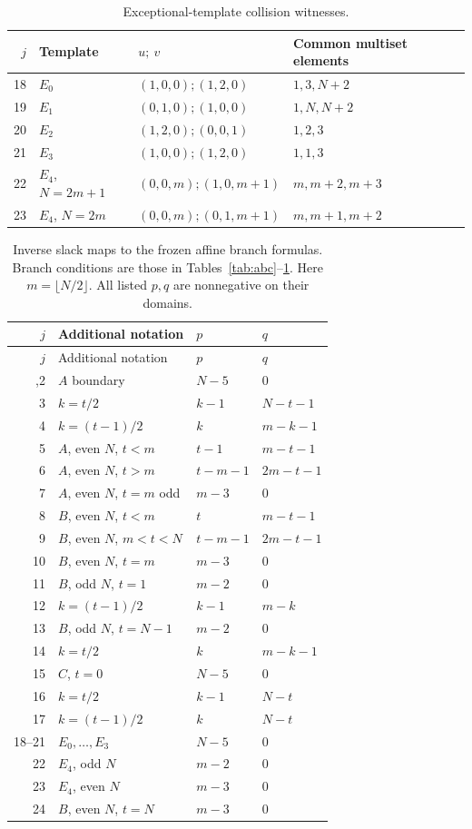 \documentclass[11pt,a4paper]{article}
\begin{document}
\begin{table}[ht]\centering\small
\caption{Exceptional-template collision witnesses.}\label{tab:exceptions}
\begin{tabular}{@{}rl ll@{}}\toprule
$j$ & Template & $u;\ v$ & Common multiset elements\\\midrule
18 & $E_0$ & $(1,0,0);(1,2,0)$ & $1,3,N+2$\\
19 & $E_1$ & $(0,1,0);(1,0,0)$ & $1,N,N+2$\\
20 & $E_2$ & $(1,2,0);(0,0,1)$ & $1,2,3$\\
21 & $E_3$ & $(1,0,0);(1,2,0)$ & $1,1,3$\\
22 & $E_4$, $N=2m+1$ & $(0,0,m);(1,0,m+1)$ & $m,m+2,m+3$\\
23 & $E_4$, $N=2m$ & $(0,0,m);(0,1,m+1)$ & $m,m+1,m+2$\\\bottomrule
\end{tabular}
\end{table}

\begingroup\small
\begin{longtable}{@{}r p{63mm} ll@{}}
\caption{Inverse slack maps to the frozen affine branch formulas. Branch conditions are those in Tables~\ref{tab:abc}--\ref{tab:exceptions}. Here $m=\lfloor N/2\rfloor$. All listed $p,q$ are nonnegative on their domains.}\label{tab:inverse}\\
\toprule $j$ & Additional notation & $p$ & $q$\\\midrule\endfirsthead
\toprule $j$ & Additional notation & $p$ & $q$\\\midrule\endhead
\bottomrule\endfoot
1,2 & $A$ boundary & $N-5$ & $0$\\
3 & $k=t/2$ & $k-1$ & $N-t-1$\\
4 & $k=(t-1)/2$ & $k$ & $m-k-1$\\
5 & $A$, even $N$, $t<m$ & $t-1$ & $m-t-1$\\
6 & $A$, even $N$, $t>m$ & $t-m-1$ & $2m-t-1$\\
7 & $A$, even $N$, $t=m$ odd & $m-3$ & $0$\\
8 & $B$, even $N$, $t<m$ & $t$ & $m-t-1$\\
9 & $B$, even $N$, $m<t<N$ & $t-m-1$ & $2m-t-1$\\
10 & $B$, even $N$, $t=m$ & $m-3$ & $0$\\
11 & $B$, odd $N$, $t=1$ & $m-2$ & $0$\\
12 & $k=(t-1)/2$ & $k-1$ & $m-k$\\
13 & $B$, odd $N$, $t=N-1$ & $m-2$ & $0$\\
14 & $k=t/2$ & $k$ & $m-k-1$\\
15 & $C$, $t=0$ & $N-5$ & $0$\\
16 & $k=t/2$ & $k-1$ & $N-t$\\
17 & $k=(t-1)/2$ & $k$ & $N-t$\\
18--21 & $E_0,\ldots,E_3$ & $N-5$ & $0$\\
22 & $E_4$, odd $N$ & $m-2$ & $0$\\
23 & $E_4$, even $N$ & $m-3$ & $0$\\
24 & $B$, even $N$, $t=N$ & $m-3$ & $0$\\
\end{longtable}\endgroup
\end{document}
